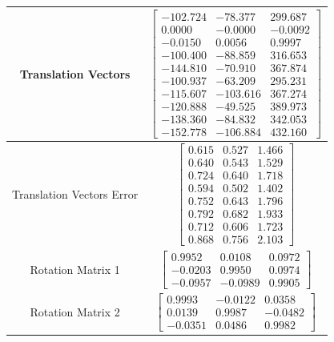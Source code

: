 \documentclass[10pt,twocolumn,letterpaper]{article}
\begin{document}
\begin{table}[h]
\small
    \centering
    \begin{tabular}{c|c}
        Translation Vectors & 
        $\begin{bmatrix}
        -102.724 & -78.377 & 299.687 \\
        0.0000 & -0.0000 & -0.0092 \\
        -0.0150 & 0.0056 & 0.9997 \\
        -100.400&	-88.859	  &  316.653 \\
        -144.810&	-70.910	 &   367.874 \\
        -100.937&	-63.209	  &  295.231 \\
        -115.607&	-103.616&	367.274 \\
        -120.888&	-49.525	 &   389.973 \\
        -138.360&	-84.832	  &  342.053 \\
        -152.778&	-106.884&	432.160
        \end{bmatrix}$ \\
        \hline
        Translation Vectors Error   & 
        $\begin{bmatrix}
        0.615&	0.527&	1.466\\
        0.640&	0.543&	1.529\\
        0.724&	0.640&	1.718\\
        0.594&	0.502&	1.402\\
        0.752&	0.643&	1.796\\
        0.792&	0.682&	1.933\\
        0.712&	0.606&	1.723\\
        0.868&	0.756&	2.103
        \end{bmatrix}$ \\ 
        \hline
        Rotation Matrix 1 & 
        $\begin{bmatrix}
        0.9952  &  0.0108  &  0.0972\\
        -0.0203  &  0.9950 &   0.0974\\
        -0.0957  & -0.0989  &  0.9905
        \end{bmatrix}$ \\ 
        \hline
        Rotation Matrix 2 & 
        $\begin{bmatrix}
        0.9993 &  -0.0122  &  0.0358\\
        0.0139 &   0.9987 &  -0.0482\\
        -0.0351 &   0.0486  &  0.9982
        \end{bmatrix}$ \\ 

\end{tabular}
\end{table}
\end{document}
